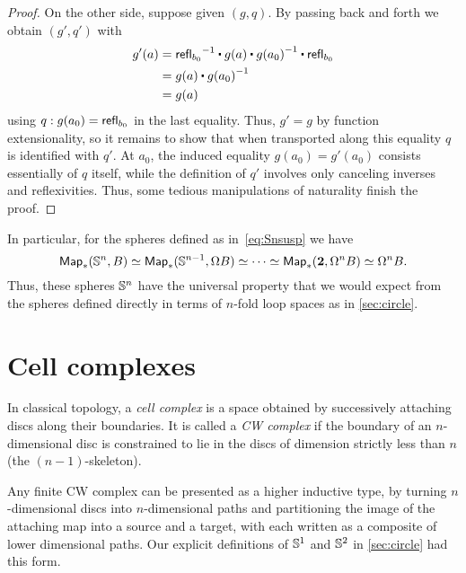 \begin{proof}
  On the other side, suppose given $(g,q)$.
  By passing back and forth we obtain $(g',q')$ with
  \begin{align*}
    g'(a) &= \opp{\refl{b_0}} \ct g(a) \ct \opp{g(a_0)} \ct \refl{b_0}\\
    &= g(a) \ct \opp{g(a_0)}\\
    &= g(a)
  \end{align*}
  using $q:g(a_0) = \mathsf{refl}_{b_0}$ in the last equality.
  Thus, $g'=g$ by function extensionality, so it remains to show that when transported along this equality $q$ is identified with $q'$.
  At $a_0$, the induced equality $g(a_0)=g'(a_0)$ consists essentially of $q$ itself, while the definition of $q'$ involves only canceling inverses and reflexivities.
  Thus, some tedious manipulations of naturality finish the proof.
\end{proof}

%
In particular, for the spheres defined as in~\eqref{eq:Snsusp} we have
%
\[ \mathsf{Map}_*(\mathbb{S}^n,B) \simeq \mathsf{Map}_*(\mathbb{S}^{n-1}, \Omega B) \simeq \cdots \simeq \mathsf{Map}_*(\mathbf{2},\Omega^n B) \simeq \Omega^n B. \]
Thus, these spheres $\mathbb{S}^n$ have the universal property that we would expect from the spheres defined directly in terms of $n$-fold loop spaces as in \autoref{sec:circle}.

%

\section{Cell complexes}
\label{sec:cell-complexes}

%
%
In classical topology, a \emph{cell complex} is a space obtained by successively attaching discs along their boundaries.
It is called a \emph{CW complex} if the boundary of an $n$-dimensional disc is constrained to lie in the discs of dimension strictly less than $n$ (the $(n-1)$-skeleton).

Any finite CW complex can be presented as a higher inductive type, by turning $n$-dimensional discs into $n$-dimensional paths and partitioning the image of the attaching map into a source and a target, with each written as a composite of lower dimensional paths.
Our explicit definitions of $\mathbb{S}^1$ and $\mathbb{S}^2$ in \autoref{sec:circle} had this form.


